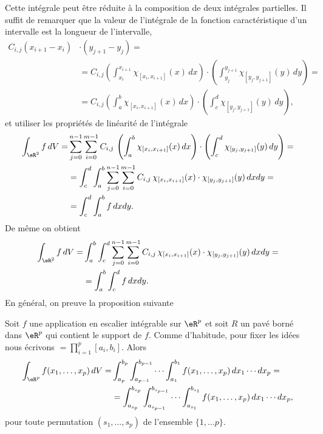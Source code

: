 Cette intégrale peut être réduite à la composition de deux intégrales partielles. Il suffit de remarquer que la valeur de l'intégrale de la fonction caractéristique d'un intervalle est la longueur de l'intervalle, 
\begin{equation}
  \begin{aligned}
    C_{i,j}(x_{i+1}-x_i)&\cdot(y_{j+1}-y_j)=\\
&=C_{i,j}\left(\int_{x_i}^{x_{i+1}}\chi_{[x_{i},x_{i+1}]}(x)\, dx \right)\cdot \left(\int_{y_j}^{y_{j+1}}\chi_{[y_{ j},y_{ j+1}]}(y)\, dy \right)=\\
&=C_{i,j}\left(\int_{a}^{b}\chi_{[x_{i},x_{i+1}]}(x)\, dx \right)\cdot \left(\int_{c}^{d}\chi_{[y_{ j},y_{ j+1}]}(y)\, dy \right),
  \end{aligned}
\end{equation}
et utiliser les propriétés de linéarité de l'intégrale
\begin{equation}
  \begin{aligned}
   \int_{\eR^2}f \,dV =& \sum_{j=0}^{n-1}\sum_{i=0}^{m-1}C_{i,j}\,\left(\int_{a}^{b}\chi_{[x_{i},x_{i+1}]}(x)\, dx \right)\cdot \left(\int_{c}^{d}\chi_{[y_{ j},y_{ j+1}]}(y)\, dy \right)=\\
&=\int_{c}^{d}\int_{a}^{b}\sum_{j=0}^{n-1}\sum_{i=0}^{m-1}C_{i,j}\,\chi_{[x_{i},x_{i+1}]}(x)\cdot \chi_{[y_{ j},y_{ j+1}]}(y)\, dx dy=\\
&=\int_{c}^{d}\int_{a}^{b} f\, dx dy.  
  \end{aligned}
\end{equation}
De même on obtient
\begin{equation}
  \begin{aligned}
   \int_{\eR^2}f \,dV =&\int_{a}^{b}\int_{c}^{d}\sum_{j=0}^{n-1}\sum_{i=0}^{m-1}C_{i,j}\,\chi_{[x_{i},x_{i+1}]}(x)\cdot \chi_{[y_{ j},y_{ j+1}]}(y)\, dx dy=\\
&=\int_{a}^{b}\int_{c}^{d} f\, dx dy.  
  \end{aligned}
\end{equation}
En général, on preuve la proposition suivante
\begin{proposition}
 Soit $f$ une application en escalier intégrable sur $\eR^p$ et soit $R$ un pavé borné dans $\eR^p$ qui contient le support de $f$. Comme d'habitude, pour fixer les idées nous écrivons $=\prod_{i=1}^p[a_i,b_i]$. Alors
 \begin{equation}
   \begin{aligned}
     \int_{\eR^p}f(x_1,\ldots, x_p) \, dV =& \int_{a_p}^{b_p}\int_{a_{p-1}}^{b_{p-1}}\cdots\int_{a_1}^{b_1} f(x_1,\ldots, x_p) \, dx_1\cdots dx_p=\\
&=\int_{a_{s_p}}^{b_{s_p}}\int_{a_{s_{p-1}}}^{b_{s_{p-1}}}\cdots\int_{a_{s_1}}^{b_{s_1}} f(x_1,\ldots, x_p) \, dx_1\cdots dx_p,
   \end{aligned}
 \end{equation}
pour toute permutation $(s_1,\ldots,s_p)$ de l'ensemble $\{1,\ldots p\}$.
\end{proposition}
